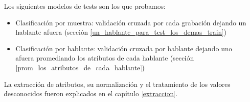 Los siguientes modelos de tests son los que probamos:
\begin{itemize}
	\item Clasificación por muestra: validación cruzada por cada grabación dejando un hablante afuera (sección \ref{un_hablante_para_test_los_demas_train})
	\item Clasificación por hablante: validación cruzada por hablante dejando uno afuera promediando los atributos de cada hablante (sección \ref{prom_los_atributos_de_cada_hablante})
\end{itemize}

La extracción de atributos, su normalización y el tratamiento de los valores desconocidos fueron explicados en el capítulo \ref{extraccion}.

%



%


%